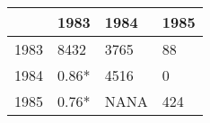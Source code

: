 \begin{table}[ht]
\centering
\begin{tabular}{rlll}
  \hline
 & 1983 & 1984 & 1985 \\ 
  \hline
1983 & 8432 & 3765 & 88 \\ 
  1984 &  0.86*  & 4516 & 0 \\ 
  1985 &  0.76*  &    NANA & 424 \\ 
   \hline
\end{tabular}
\end{table}
